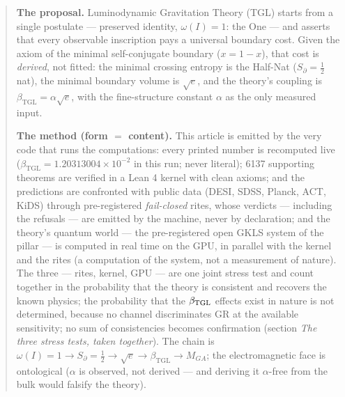 \documentclass[11pt]{article}
\newcommand{\bTGL}{\beta_{\mathrm{TGL}}}\newcommand{\Msun}{M_{\odot}}\newcommand{\TGL}{\mathrm{TGL}}
\theoremstyle{definition}\newtheorem{deriv}{Derivation}
\begin{document}
\begin{abstract}

\textbf{The proposal.} Luminodynamic Gravitation Theory (TGL) starts from a single postulate --- preserved identity, $\omega(I)=1$: the One --- and asserts that every observable inscription pays a universal boundary cost. Given the axiom of the minimal self-conjugate boundary ($x=1-x$), that cost is \emph{derived}, not fitted: the minimal crossing entropy is the Half-Nat ($S_\partial=\tfrac12$ nat), the minimal boundary volume is $\sqrt e$, and the theory's coupling is $\bTGL=\alpha\sqrt e$, with the fine-structure constant $\alpha$ as the only measured input.

\textbf{The method (form $=$ content).} This article is emitted by the very code that runs the computations: every printed number is recomputed live ($\bTGL=1.20313004\times10^{-2}$ in this run; never literal); 6137 supporting theorems are verified in a Lean 4 kernel with clean axioms; and the predictions are confronted with public data (DESI, SDSS, Planck, ACT, KiDS) through pre-registered \emph{fail-closed} rites, whose verdicts --- including the refusals --- are emitted by the machine, never by declaration; and the theory's quantum world --- the pre-registered open GKLS system of the pillar --- is computed in real time on the GPU, in parallel with the kernel and the rites (a computation of the system, not a measurement of nature). The three --- rites, kernel, GPU --- are one joint stress test and count together in the probability that the theory is consistent and recovers the known physics; the probability that the $\beta_{\rm TGL}$ effects exist in nature is not determined, because no channel discriminates GR at the available sensitivity; no sum of consistencies becomes confirmation (section \emph{The three stress tests, taken together}). The chain is $\omega(I)=1\to S_\partial=\tfrac12\to\sqrt e\to\bTGL\to M_{GA}$; the electromagnetic face is ontological ($\alpha$ is observed, not derived --- and deriving it $\alpha$-free from the bulk would falsify the theory).


\end{abstract}
\end{document}
